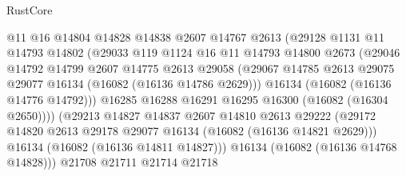 \begin{lexlean}{RustCore}
\begin{coremodule}
                            @11
                            @16
                            @14804
                            @14828
                            @14838
                            @2607
                            @14767
                            @2613
                            (@29128
                              @1131
                              @11
                              @14793
                              @14802
                              (@29033
                                @119
                                @1124
                                @16
                                @11
                                @14793
                                @14800
                                @2673
                                (@29046
                                  @14792
                                  @14799
                                  @2607
                                  @14775
                                  @2613
                                  @29058
                                  (@29067
                                    @14785
                                    @2613
                                    @29075
                                    @29077
                                    @16134
                                    (@16082 (@16136 @14786 @2629)))
                                  @16134
                                  (@16082 (@16136 @14776 @14792)))
                                @16285
                                @16288
                                @16291
                                @16295
                                @16300
                                (@16082 (@16304 @2650))))
                            (@29213
                              @14827
                              @14837
                              @2607
                              @14810
                              @2613
                              @29222
                              (@29172
                                @14820
                                @2613
                                @29178
                                @29077
                                @16134
                                (@16082 (@16136 @14821 @2629)))
                              @16134
                              (@16082 (@16136 @14811 @14827)))
                            @16134
                            (@16082 (@16136 @14768 @14828)))
                          @21708
                          @21711
                          @21714
                          @21718

\end{coremodule}
\end{lexlean}
